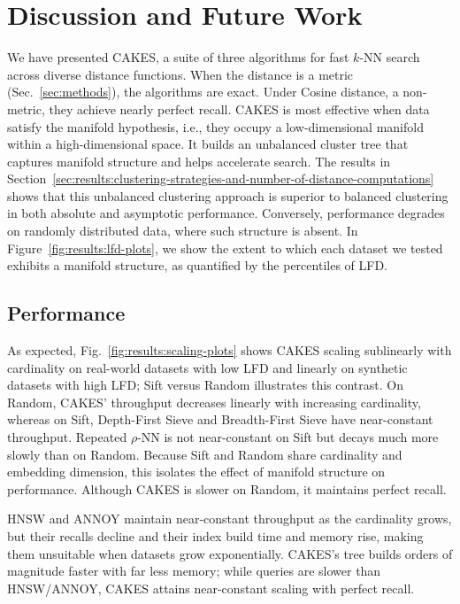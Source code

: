 \section{Discussion and Future Work}
\label{sec:discussion-and-future-work}

We have presented CAKES, a suite of three algorithms for fast $k$-NN search across diverse distance functions.
When the distance is a metric (Sec.~\ref{sec:methods}), the algorithms are exact.
Under Cosine distance, a non-metric, they achieve nearly perfect recall.
CAKES is most effective when data satisfy the manifold hypothesis, i.e., they occupy a low-dimensional manifold within a high-dimensional space. 
It builds an unbalanced cluster tree that captures manifold structure and helps accelerate search. The results in Section~\ref{sec:results:clustering-strategies-and-number-of-distance-computations} shows that this unbalanced clustering approach is superior to balanced clustering in both absolute and asymptotic performance. 
Conversely, performance degrades on randomly distributed data, where such structure is absent.
In Figure~\ref{fig:results:lfd-plots}, we show the extent to which each dataset we tested exhibits a manifold structure, as quantified by the percentiles of LFD.  


\subsection{Performance}

As expected, Fig.~\ref{fig:results:scaling-plots} shows CAKES scaling sublinearly with cardinality on real-world datasets with low LFD and linearly on synthetic datasets with high LFD;
Sift versus Random illustrates this contrast.
On Random, CAKES' throughput decreases linearly with increasing cardinality, whereas on Sift, Depth-First Sieve and Breadth-First Sieve have near-constant throughput.
Repeated $\rho$-NN is not near-constant on Sift but decays much more slowly than on Random.
Because Sift and Random share cardinality and embedding dimension, this isolates the effect of manifold structure on performance.
Although CAKES is slower on Random, it maintains perfect recall.

HNSW and ANNOY maintain near-constant throughput as the cardinality grows, but their recalls decline and their index build time and memory rise, making them unsuitable when datasets grow exponentially.
CAKES's tree builds orders of magnitude faster with far less memory; while queries are slower than HNSW/ANNOY, CAKES attains near-constant scaling with perfect recall.


